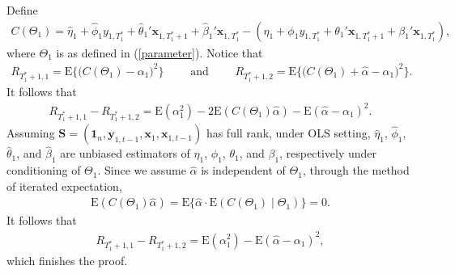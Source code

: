 \documentclass[11pt]{article}
\def\mbf#1{\mathbf{#1}} %
\def\mrm#1{\mathrm{#1}} %
\def\E#1{\mathrm{E}(#1)} %
\theoremstyle{definition}
\newenvironment{proof-of-lemma}[1][{}]{\noindent{\bf
    Proof of Lemma {#1}}
  \hspace*{.5em}}{\qed\bigskip\\}
\begin{document}
  
\begin{proof-of-lemma}[\ref{risklemma}]
  Define 
  \begin{align*}
    C(\Theta_1) =\hat{\eta}_1 +\hat{\phi}_1 y_{1, T_1^*}+\hat{\theta}_1'\mbf{x}_{1, T_1^*+1} + \hat{\beta}_1'\mbf{x}_{1, T_1^*}-(\eta_1 +\phi_1y_{1,T_1^*}+\theta_1'\mbf{x}_{1,T_1^*+1}+\beta_1'\mbf{x}_{1,T_1^*}),
  \end{align*}
  where $\Theta_1$ is as defined in (\ref{parameter}). Notice that
  \begin{align*}
    R_{T_1^*+1,1}= \mrm{E}\big\{\big(C(\Theta_1)-\alpha_1\big)^2\big\}
    \qquad \text{ and } 
    \qquad  R_{T_1^*+1,2}= \mrm{E}\big\{\big(C(\Theta_1)+\hat{\alpha}-\alpha_1\big)^2\big\}.
  \end{align*}
  It follows that
  \begin{align*}
    R_{T_1^*+1,1}-R_{T_1^*+1,2}=\E{\alpha_1^2}-2\E{C(\Theta_1)\hat{\alpha}}-\E{\hat{\alpha}-\alpha_1}^2.
  \end{align*}
  Assuming $\mbf{S}=(\mbf{1}_n, \mbf{y}_{1,t-1}, \mbf{x}_{1}, \mbf{x}_{1,t-1})$ has full rank, under OLS setting, $\hat{\eta}_1$, $\hat{\phi}_1$, $\hat{\theta}_1$, and $\hat{\beta}_1$ are unbiased estimators of $\eta_1$, $\phi_1$, $\theta_1$, and $\beta_1$, respectively under conditioning of $\Theta_1$. Since we assume $\hat{\alpha}$ is independent of $\Theta_1$, through the method of iterated expectation,
  \begin{align*}
    \E{C(\Theta_1)\hat{\alpha}}=\mrm{E}\big\{\hat{\alpha}\cdot \E{C(\Theta_1)\mid \Theta_1}\}=0.
  \end{align*}
  It follows that
  \begin{align*}
    R_{T_1^*+1,1}-R_{T_1^*+1,2}=\E{\alpha_1^2}-\E{\hat{\alpha}-\alpha_1}^2,
  \end{align*}
  which finishes the proof.
\end{proof-of-lemma}
\end{document}
